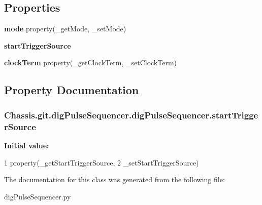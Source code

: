 \subsection*{Properties}
\begin{DoxyCompactItemize}
\item 
\hypertarget{class_chassis_8git_1_1dig_pulse_sequencer_1_1dig_pulse_sequencer_a0e11aeeb67f5b1eeee32170fde075198}{{\bfseries mode} property(\-\_\-get\-Mode, \-\_\-set\-Mode)}\label{class_chassis_8git_1_1dig_pulse_sequencer_1_1dig_pulse_sequencer_a0e11aeeb67f5b1eeee32170fde075198}

\item 
{\bfseries start\-Trigger\-Source}
\item 
\hypertarget{class_chassis_8git_1_1dig_pulse_sequencer_1_1dig_pulse_sequencer_a26a64423087618a0a9ab42996f51bc8c}{{\bfseries clock\-Term} property(\-\_\-get\-Clock\-Term, \-\_\-set\-Clock\-Term)}\label{class_chassis_8git_1_1dig_pulse_sequencer_1_1dig_pulse_sequencer_a26a64423087618a0a9ab42996f51bc8c}

\end{DoxyCompactItemize}


\subsection{Property Documentation}
\hypertarget{class_chassis_8git_1_1dig_pulse_sequencer_1_1dig_pulse_sequencer_a0e1eda4ab9fe43ba62440d0e01eebb49}{
\subsubsection[{start\-Trigger\-Source}]{\setlength{\rightskip}{0pt plus 5cm}Chassis.\-git.\-dig\-Pulse\-Sequencer.\-dig\-Pulse\-Sequencer.\-start\-Trigger\-Source\hspace{0.3cm}{\ttfamily [static]}}}\label{class_chassis_8git_1_1dig_pulse_sequencer_1_1dig_pulse_sequencer_a0e1eda4ab9fe43ba62440d0e01eebb49}
{\bfseries Initial value\-:}
\begin{DoxyCode}
1 property(\_getStartTriggerSource,
2             \_setStartTriggerSource)
\end{DoxyCode}


The documentation for this class was generated from the following file\-:\begin{DoxyCompactItemize}
\item 
dig\-Pulse\-Sequencer.\-py\end{DoxyCompactItemize}

